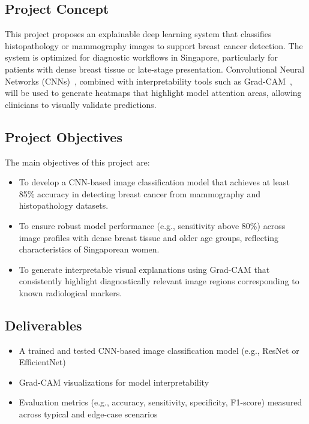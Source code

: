 \documentclass[12pt]{article}
\begin{document}
\subsection{Project Concept}
This project proposes an explainable deep learning system that classifies histopathology or mammography images to support breast cancer detection. The system is optimized for diagnostic workflows in Singapore, particularly for patients with dense breast tissue or late-stage presentation. Convolutional Neural Networks (CNNs)~\cite{17}, combined with interpretability tools such as Grad-CAM~\cite{5}, will be used to generate heatmaps that highlight model attention areas, allowing clinicians to visually validate predictions.

\subsection{Project Objectives}
The main objectives of this project are:
\begin{itemize}
    \item To develop a CNN-based image classification model that achieves at least 85\% accuracy in detecting breast cancer from mammography and histopathology datasets.
    \item To ensure robust model performance (e.g., sensitivity above 80\%) across image profiles with dense breast tissue and older age groups, reflecting characteristics of Singaporean women.
    \item To generate interpretable visual explanations using Grad-CAM that consistently highlight diagnostically relevant image regions corresponding to known radiological markers.
\end{itemize}

\subsection{Deliverables}
\begin{itemize}
    \item A trained and tested CNN-based image classification model (e.g., ResNet or EfficientNet)
    \item Grad-CAM visualizations for model interpretability
    \item Evaluation metrics (e.g., accuracy, sensitivity, specificity, F1-score) measured across typical and edge-case scenarios
\end{itemize}


\newpage
\end{document}
